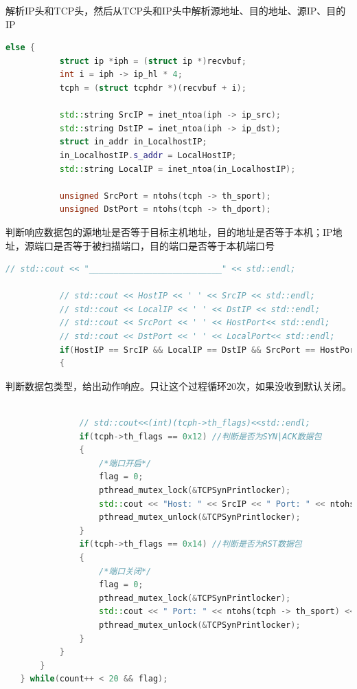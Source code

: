 \documentclass[UTF8,a4paper,10pt]{ctexart}
\begin{document}
解析IP头和TCP头，然后从TCP头和IP头中解析源地址、目的地址、源IP、目的IP
\begin{lstlisting}[language = C++]
       else {
           struct ip *iph = (struct ip *)recvbuf; 
           int i = iph -> ip_hl * 4; 
           tcph = (struct tcphdr *)(recvbuf + i); 

           std::string SrcIP = inet_ntoa(iph -> ip_src);
           std::string DstIP = inet_ntoa(iph -> ip_dst);
           struct in_addr in_LocalhostIP;
           in_LocalhostIP.s_addr = LocalHostIP;
           std::string LocalIP = inet_ntoa(in_LocalhostIP);

           unsigned SrcPort = ntohs(tcph -> th_sport);    
           unsigned DstPort = ntohs(tcph -> th_dport);  
\end{lstlisting}
判断响应数据包的源地址是否等于目标主机地址，目的地址是否等于本机；IP地址，源端口是否等于被扫描端口，目的端口是否等于本机端口号
\begin{lstlisting}[language = C++]
           // std::cout << "___________________________" << std::endl;

           // std::cout << HostIP << ' ' << SrcIP << std::endl;
           // std::cout << LocalIP << ' ' << DstIP << std::endl;
           // std::cout << SrcPort << ' ' << HostPort<< std::endl;
           // std::cout << DstPort << ' ' << LocalPort<< std::endl;
           if(HostIP == SrcIP && LocalIP == DstIP && SrcPort == HostPort && DstPort == LocalPort)
           {
\end{lstlisting}
判断数据包类型，给出动作响应。只让这个过程循环20次，如果没收到默认关闭。
\begin{lstlisting}[language = C++]
          
               // std::cout<<(int)(tcph->th_flags)<<std::endl;
               if(tcph->th_flags == 0x12) //判断是否为SYN|ACK数据包
               {
                   /*端口开启*/
                   flag = 0;
                   pthread_mutex_lock(&TCPSynPrintlocker);
                   std::cout << "Host: " << SrcIP << " Port: " << ntohs(tcph -> th_sport) << " open !" << std::endl;
                   pthread_mutex_unlock(&TCPSynPrintlocker);
               }
               if(tcph->th_flags == 0x14) //判断是否为RST数据包
               { 
                   /*端口关闭*/
                   flag = 0; 
                   pthread_mutex_lock(&TCPSynPrintlocker);
                   std::cout << " Port: " << ntohs(tcph -> th_sport) << " closed !" << std::endl;
                   pthread_mutex_unlock(&TCPSynPrintlocker); 
               }
           }
       }
   } while(count++ < 20 && flag);
\end{lstlisting}
\end{document}
